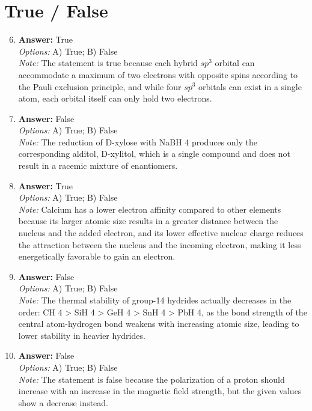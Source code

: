 \documentclass[12pt]{article}
\begin{document}
\section*{True / False}
\begin{enumerate}[label=\arabic*.]
\setcounter{enumi}{5}
\item \textbf{Answer:} True
\\ \textit{Options:} A) True; B) False
\\ \textit{Note:} The statement is true because each hybrid $sp^3$ orbital can accommodate a maximum of two electrons with opposite spins according to the Pauli exclusion principle, and while four $sp^3$ orbitals can exist in a single atom, each orbital itself can only hold two electrons.
\item \textbf{Answer:} False
\\ \textit{Options:} A) True; B) False
\\ \textit{Note:} The reduction of D-xylose with NaBH 4 produces only the corresponding alditol, D-xylitol, which is a single compound and does not result in a racemic mixture of enantiomers.
\item \textbf{Answer:} True
\\ \textit{Options:} A) True; B) False
\\ \textit{Note:} Calcium has a lower electron affinity compared to other elements because its larger atomic size results in a greater distance between the nucleus and the added electron, and its lower effective nuclear charge reduces the attraction between the nucleus and the incoming electron, making it less energetically favorable to gain an electron.
\item \textbf{Answer:} False
\\ \textit{Options:} A) True; B) False
\\ \textit{Note:} The thermal stability of group-14 hydrides actually decreases in the order: CH 4 \textgreater{} SiH 4 \textgreater{} GeH 4 \textgreater{} SnH 4 \textgreater{} PbH 4, as the bond strength of the central atom-hydrogen bond weakens with increasing atomic size, leading to lower stability in heavier hydrides.
\item \textbf{Answer:} False
\\ \textit{Options:} A) True; B) False
\\ \textit{Note:} The statement is false because the polarization of a proton should increase with an increase in the magnetic field strength, but the given values show a decrease instead.
\end{enumerate}
\end{document}
